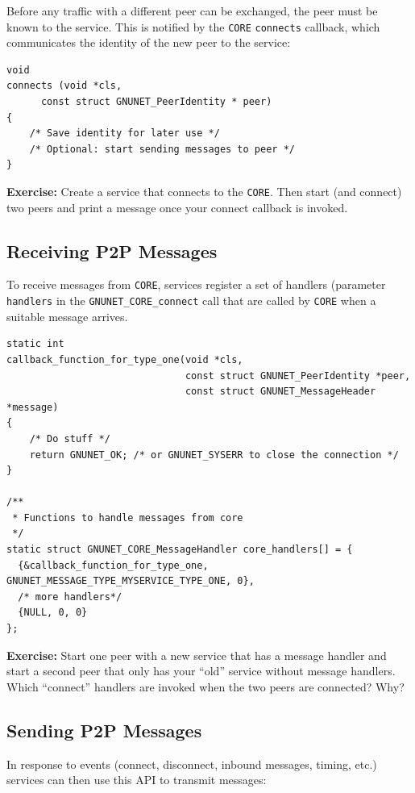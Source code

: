 \documentclass[10pt]{article}
\newcommand{\exercise}[1]{\noindent\begin{boxedminipage}{\textwidth}{\bf Exercise:} #1 \end{boxedminipage}}
\begin{document}
Before any traffic with a different peer can be exchanged, the peer must be
known to the service. This is notified by the \texttt{CORE} {\tt connects} callback,
which communicates the identity of the new peer to the service:

\lstset{language=C}
\begin{lstlisting}
void
connects (void *cls,
	  const struct GNUNET_PeerIdentity * peer)
{
    /* Save identity for later use */
    /* Optional: start sending messages to peer */
}
\end{lstlisting}

\exercise{Create a service that connects to the \texttt{CORE}.  Then
start (and connect) two peers and print a message once your connect
callback is invoked.}

\subsection{Receiving P2P Messages}

To receive messages from \texttt{CORE}, services register a set of handlers
(parameter {\tt *handlers} in the \lstinline|GNUNET_CORE_connect| call that are called by \texttt{CORE}
when a suitable message arrives.

\lstset{language=c}
\begin{lstlisting}
static int
callback_function_for_type_one(void *cls,
                               const struct GNUNET_PeerIdentity *peer,
                               const struct GNUNET_MessageHeader *message)
{
    /* Do stuff */
    return GNUNET_OK; /* or GNUNET_SYSERR to close the connection */
}

/**
 * Functions to handle messages from core
 */
static struct GNUNET_CORE_MessageHandler core_handlers[] = {
  {&callback_function_for_type_one, GNUNET_MESSAGE_TYPE_MYSERVICE_TYPE_ONE, 0},
  /* more handlers*/
  {NULL, 0, 0}
};
\end{lstlisting}

\exercise{Start one peer with a new service that has a message
handler and start a second peer that only has your ``old'' service
without message handlers.  Which ``connect'' handlers are invoked when
the two peers are connected?  Why?}


\subsection{Sending P2P Messages}

In response to events (connect, disconnect, inbound messages,
timing, etc.) services can then use this API to transmit messages:
\end{document}
